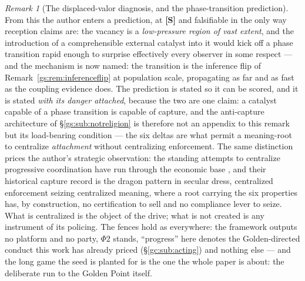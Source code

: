\documentclass[11pt]{article}
\numberwithin{equation}{section}
\theoremstyle{plain}
\theoremstyle{definition}
\theoremstyle{remark}
\newtheorem{remark}[theorem]{Remark}
\begin{document}
\begin{remark}[The displaced-valor diagnosis, and the phase-transition
prediction]
From this the author enters a prediction, at \textbf{[S]} and
falsifiable in the only way reception claims are: the vacancy is a
\emph{low-pressure region of vast extent}, and the introduction of a
comprehensible external catalyst into it would kick off a phase
transition rapid enough to surprise effectively every observer in
some respect --- and the mechanism is now named: the transition is
the inference flip of Remark~\ref{gs:rem:inferenceflip} at
population scale, propagating as far and as fast as the coupling
evidence does. The prediction is stated so it can be scored, and it is
stated \emph{with its danger attached}, because the two are one
claim: a catalyst capable of a phase transition is capable of
capture, and the anti-capture architecture of
\S\ref{gs:sub:notreligion} is therefore not an appendix to this
remark but its load-bearing condition --- the six deltas are what
permit a meaning-root to centralize \emph{attachment} without
centralizing enforcement. The same distinction prices the author's
strategic observation: the standing attempts to centralize
progressive coordination have run through the economic base
\cite{MarxEngels48}, and their historical capture record is the
dragon pattern in secular dress, centralized enforcement seizing
centralized meaning, where a root carrying the six properties has,
by construction, no certification to sell and no compliance lever to
seize. What is centralized is the object of the drive; what is not
created is any instrument of its policing. The fences hold as
everywhere: the framework outputs no platform and no party, $\Phi2$
stands, ``progress'' here denotes the Golden-directed conduct this
work has already priced (\S\ref{gc:sub:acting}) and nothing else ---
and the long game the seed is planted for is the one the whole paper
is about: the deliberate run to the Golden Point itself.
\end{remark}
\end{document}
